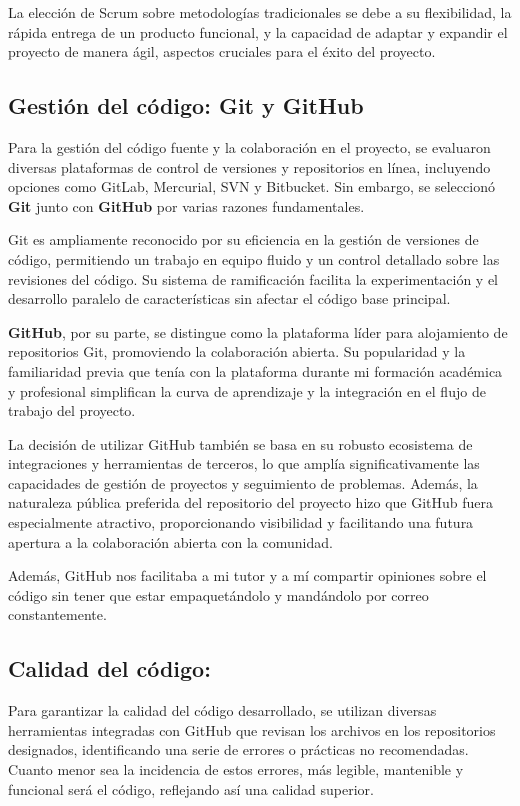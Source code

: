 La elección de Scrum sobre metodologías tradicionales se debe a su flexibilidad, la rápida entrega de un producto funcional, y la capacidad de adaptar y expandir el proyecto de manera ágil, aspectos cruciales para el éxito del proyecto.

\subsection{Gestión del código: Git y GitHub}
Para la gestión del código fuente y la colaboración en el proyecto, se evaluaron diversas plataformas de control de versiones y repositorios en línea, incluyendo opciones como GitLab, Mercurial, SVN y Bitbucket. Sin embargo, se seleccionó \textbf{Git}\cite{Git} junto con \textbf{GitHub}\cite{Github} por varias razones fundamentales.

Git es ampliamente reconocido por su eficiencia en la gestión de versiones de código, permitiendo un trabajo en equipo fluido y un control detallado sobre las revisiones del código. Su sistema de ramificación facilita la experimentación y el desarrollo paralelo de características sin afectar el código base principal.

\textbf{GitHub}, por su parte, se distingue como la plataforma líder para alojamiento de repositorios Git, promoviendo la colaboración abierta. Su popularidad y la familiaridad previa que tenía con la plataforma durante mi formación académica y profesional simplifican la curva de aprendizaje y la integración en el flujo de trabajo del proyecto.

La decisión de utilizar GitHub también se basa en su robusto ecosistema de integraciones y herramientas de terceros, lo que amplía significativamente las capacidades de gestión de proyectos y seguimiento de problemas. Además, la naturaleza pública preferida del repositorio del proyecto hizo que GitHub fuera especialmente atractivo, proporcionando visibilidad y facilitando una futura apertura a la colaboración abierta con la comunidad.

Además, GitHub nos facilitaba a mi tutor y a mí compartir opiniones sobre el código sin tener que estar empaquetándolo y mandándolo por correo constantemente.

\subsection{Calidad del código:}
Para garantizar la calidad del código desarrollado, se utilizan diversas herramientas integradas con GitHub que revisan los archivos en los repositorios designados, identificando una serie de errores o prácticas no recomendadas. Cuanto menor sea la incidencia de estos errores, más legible, mantenible y funcional será el código, reflejando así una calidad superior.

